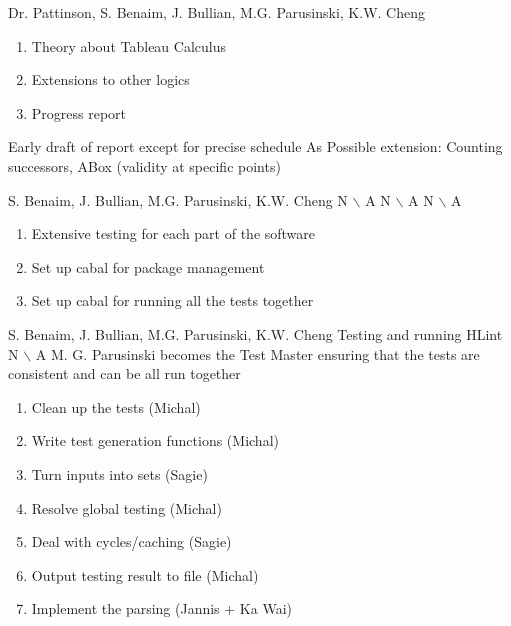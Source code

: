%
{Dr. Pattinson, S. Benaim, J. Bullian, M.G. Parusinski, K.W. Cheng}%
{\begin{enumerate}
\item Theory about Tableau Calculus
\item Extensions to other logics
\item Progress report
\end{enumerate} }%
{Early draft of report except for precise schedule}
{As Possible extension: Counting successors, ABox (validity at specific points)}%
{}%

%
{S. Benaim, J. Bullian, M.G. Parusinski, K.W. Cheng}%
{N $\backslash$ A}%
{N $\backslash$ A}%
{N $\backslash$ A}
{\begin{enumerate}
\item Extensive testing for each part of the software
\item Set up cabal for package management
\item Set up cabal for running all the tests together
\end{enumerate}}%

%
{S. Benaim, J. Bullian, M.G. Parusinski, K.W. Cheng}%
{Testing and running HLint}%
{N $\backslash$ A}%
{M. G. Parusinski becomes the Test Master ensuring that the tests are consistent and can be all run together}
{\begin{enumerate}
\item Clean up the tests (Michal) 
\item Write test generation functions (Michal)
\item Turn inputs into sets (Sagie)
\item Resolve global testing (Michal)
\item Deal with cycles/caching (Sagie)
\item Output testing result to file (Michal)
\item Implement the parsing (Jannis + Ka Wai)
\end{enumerate}}%

